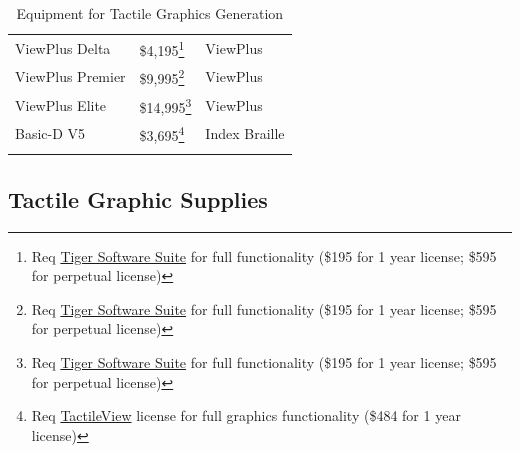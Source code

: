 \documentclass[14pt,letterpaper,twoside]{extreport}
\begin{document}
\begin{longtable}[]{@{}
	>{\raggedright\arraybackslash}m{}
	>{\raggedright\arraybackslash}m{}
	>{\raggedright\arraybackslash}m{}@{}
	}
	ViewPlus Delta                                      & \$4,195\footnote{Req \href{https://viewplus.com/product/tiger-software-suite8/}{Tiger Software Suite} for full functionality (\$195 for 1 year license; \$595 for perpetual license)}  & ViewPlus            \\[1.5em]
	ViewPlus Premier                                    & \$9,995\footnote{Req \href{https://viewplus.com/product/tiger-software-suite8/}{Tiger Software Suite} for full functionality (\$195 for 1 year license; \$595 for perpetual license)}  & ViewPlus            \\[1.5em]
	ViewPlus Elite                                      & \$14,995\footnote{Req \href{https://viewplus.com/product/tiger-software-suite8/}{Tiger Software Suite} for full functionality (\$195 for 1 year license; \$595 for perpetual license)} & ViewPlus            \\[1.5em]
	Basic-D V5                                          & \$3,695\footnote{Req \href{https://tactileview.com/}{TactileView} license for full graphics functionality (\$484 for 1 year license)}                                                  & Index Braille       \\[1.5em]\hline
	\caption{ Equipment for Tactile Graphics Generation}
\end{longtable}

\hypertarget{tactile-paper}{%
	\subsection{Tactile Graphic Supplies}\label{tactile-paper}}
\end{document}
